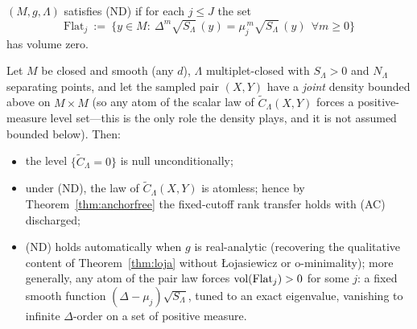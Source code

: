 \begin{definition}\label{def:nd}
$(M,g,\Lambda)$ satisfies \textup{(ND)} if for each $j\le J$ the set
\[
\mathrm{Flat}_j\ :=\ \bigl\{y\in M:\ \Delta^m\sqrt{S_\Lambda}\,(y)
=\mu_j^{\,m}\sqrt{S_\Lambda}\,(y)\ \ \forall m\ge0\bigr\}
\]
has volume zero.
\end{definition}

\begin{theorem}\label{thm:smoothAC}
Let $M$ be closed and smooth (any $d$), $\Lambda$ multiplet-closed with
$S_\Lambda>0$ and $N_\Lambda$ separating points, and let the sampled pair
$(X,Y)$ have a \emph{joint} density bounded above on $M\times M$ (so any atom of
the scalar law of $\widetilde C_\Lambda(X,Y)$ forces a positive-measure level
set---this is the only role the density plays, and it is not assumed bounded
below).  Then:
\begin{itemize}
\item[(a)] the level $\{\widetilde C_\Lambda=0\}$ is null unconditionally;
\item[(b)] under \textup{(ND)}, the law of $\widetilde C_\Lambda(X,Y)$ is
atomless; hence by Theorem~\ref{thm:anchorfree} the fixed-cutoff rank transfer
holds with \textup{(AC)} discharged;
\item[(c)] \textup{(ND)} holds automatically when $g$ is real-analytic
(recovering the qualitative content of Theorem~\ref{thm:loja} without \L ojasiewicz or
o-minimality); more generally, any atom of the pair law forces
$\operatorname{vol}(\mathrm{Flat}_j)>0$ for some $j$: a fixed smooth function
$(\Delta-\mu_j)\sqrt{S_\Lambda}$, tuned to an exact eigenvalue, vanishing to
infinite $\Delta$-order on a set of positive measure.
\end{itemize}
\end{theorem}

